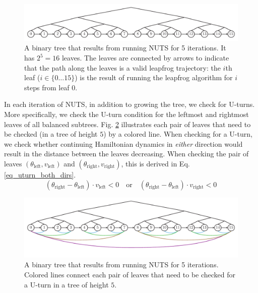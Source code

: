 \documentclass[12pt]{article}
\begin{document}
\begin{figure}[H]
\centering
\includegraphics[width=16cm]{illustrations/nuts_tree.pdf}
\caption{A binary tree that results from running NUTS for 5 iterations. It has $2^5 = 16$ leaves. The leaves are connected by arrows to indicate that the path along the leaves is a valid leapfrog trajectory: the $i$th leaf ($i \in \{0 \ldots 15\}$) is the result of running the leapfrog algorithm for $i$ steps from leaf $0$.}
\label{fig_nuts_tree}
\end{figure}

In each iteration of NUTS, in addition to growing the tree, we check for U-turns. More specifically, we check the U-turn condition for the leftmost and rightmost leaves of all balanced subtrees. Fig. \ref{fig_nuts_uturn_leaves} illustrates each pair of leaves that need to be checked (in a tree of height $5$) by a colored line. When checking for a U-turn, we check whether continuing Hamiltonian dynamics in \textit{either} direction would result in the distance between the leaves decreasing. When checking the pair of leaves $(\theta_\text{left}, v_\text{left})$ and $(\theta_\text{right}, v_\text{right})$, this is derived in Eq. \ref{eq_uturn_both_dirs}.
\begin{equation}
(\theta_\text{right} - \theta_\text{left}) \cdot v_\text{left} < 0
\quad \text{or} \quad
(\theta_\text{right} - \theta_\text{left}) \cdot v_\text{right} < 0
\label{eq_uturn_both_dirs}
\end{equation}

\begin{figure}[H]
\centering
\includegraphics[width=16cm]{illustrations/nuts_uturn_leaves.pdf}
\caption{A binary tree that results from running NUTS for 5 iterations. Colored  lines connect each pair of leaves that need to be checked for a U-turn in a tree of height $5$.}
\label{fig_nuts_uturn_leaves}
\end{figure}
\end{document}
